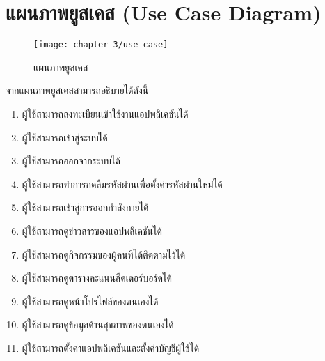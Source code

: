 \section{แผนภาพยูสเคส (Use Case Diagram)}
\begin{figure}
    \texttt{[image: chapter\_3/use case]}
    \caption{แผนภาพยูสเคส}
\end{figure}
จากแผนภาพยูสเคสสามารถอธิบายได้ดังนี้
\begin{enumerate}
    \item ผู้ใช้สามารถลงทะเบียนเข้าใช้งานแอปพลิเคชันได้
    \item ผู้ใช้สามารถเข้าสู่ระบบได้
    \item ผู้ใช้สามารถออกจากระบบได้
    \item ผู้ใช้สามารถทำการกดลืมรหัสผ่านเพื่อตั้งค่ารหัสผ่านใหม่ได้
    \item ผู้ใช้สามารถเข้าสู่การออกกำลังกายได้
    \item ผู้ใช้สามารถดูข่าวสารของแอปพลิเคชันได้
    \item ผู้ใช้สามารถดูกิจกรรมของผู้คนที่ได้ติดตามไว้ได้
    \item ผู้ใช้สามารถดูตารางคะแนนลีดเดอร์บอร์ดได้
    \item ผู้ใช้สามารถดูหน้าโปรไฟล์ของตนเองได้
    \item ผู้ใช้สามารถดูข้อมูลด้านสุขภาพของตนเองได้
    \item ผู้ใช้สามารถตั้งค่าแอปพลิเคชันและตั้งค่าบัญชีผู้ใช้ได้
\end{enumerate}
\clearpage

